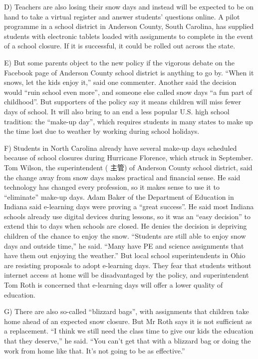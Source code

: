 \documentclass[UTF8,11pt]{ctexart}
\begin{document}
D) Teachers are also losing their snow days and instead will be expected to be on hand to take a virtual register and answer students’ questions online. A pilot programme in a school district in Anderson County, South Carolina, has supplied students with electronic tablets loaded with assignments to complete in the event of a school closure. If it is successful, it could be rolled out across the state.


E) But some parents object to the new policy if the vigorous debate on the Facebook page of Anderson County school district is anything to go by. “When it snows, let the kids enjoy it,” said one commenter. Another said the decision would “ruin school even more”, and someone else called snow days “a fun part of childhood”. But supporters of the policy say it means children will miss fewer days of school. It will also bring to an end a less popular U.S. high school tradition: the “make-up day”, which requires students in many states to make up the time lost due to weather by working during school holidays.


F) Students in North Carolina already have several make-up days scheduled because of school closures during Hurricane Florence, which struck in September. Tom Wilson, the superintendent ( 主管) of Anderson County school district, said the change away from snow days makes practical and financial sense. He said technology has changed every profession, so it makes sense to use it to “eliminate” make-up days. Adam Baker of the Department of Education in Indiana said e-learning days were proving a “great success”. He said most Indiana schools already use digital devices during lessons, so it was an “easy decision” to extend this to days when schools are closed. He denies the decision is depriving children of the chance to enjoy the snow. “Students are still able to enjoy snow days and outside time,” he said. “Many have PE and science assignments that have them out enjoying the weather.” But local school superintendents in Ohio are resisting proposals to adopt e-learning days. They fear that students without internet access at home will be disadvantaged by the policy, and superintendent Tom Roth is concerned that e-learning days will offer a lower quality of education.


G) There are also so-called “blizzard bags”, with assignments that children take home ahead of an expected snow closure. But Mr Roth says it is not sufficient as a replacement. “I think we still need the class time to give our kids the education that they deserve,” he said. “You can’t get that with a blizzard bag or doing the work from home like that. It’s not going to be as effective.”
\end{document}
